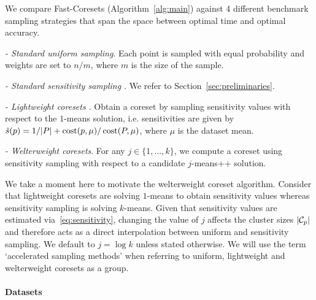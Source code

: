 We compare Fast-Coresets (Algorithm~\ref{alg:main}) against 4 different benchmark sampling strategies that span the space between optimal time and optimal
accuracy.
\begin{description}
        \item \emph{- Standard uniform sampling}. Each point is sampled with equal probability and weights are set to $n / m$, where $m$ is the size of the sample.
        \item \emph{- Standard sensitivity sampling \cite{LS10}}. We refer to Section~\ref{sec:preliminaries}.
        \item \emph{- Lightweight coresets \cite{bachem2018scalable}}. Obtain a coreset by sampling sensitivity values with respect to the $1$-means solution,
            i.e. sensitivities are given by $\hat{s}(p) = 1/|P| + \operatorname{cost}(p, \mu) / \operatorname{cost}(P, \mu)$, where $\mu$ is the dataset mean.
        \item \emph{- Welterweight coresets}. For any $j \in \{1,..., k\}$, we compute a coreset using sensitivity sampling with respect to a candidate
            $j$-means++ solution.
\end{description}

We take a moment here to motivate the welterweight coreset algorithm.  Consider that lightweight coresets are solving $1$-means to obtain sensitivity values
whereas sensitivity sampling is solving $k$-means. Given that sensitivity values are estimated via~\cref{eq:sensitivity}, changing the value of $j$
affects the cluster sizes $|\mathcal C_p|$ and therefore acts as a direct interpolation between uniform and sensitivity sampling.  We default to $j = \log k$ unless
stated otherwise. We will use the term `accelerated sampling methods' when referring to uniform, lightweight and welterweight coresets as a group.

\paragraph*{Datasets}
\label{sssec:datasets}

